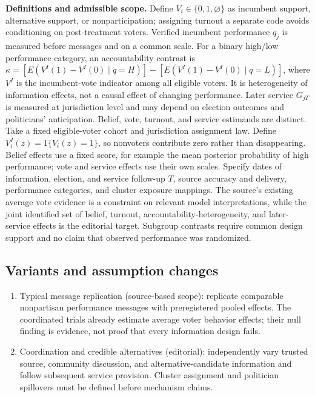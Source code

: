 \documentclass[11pt,a4paper]{article}
\begin{document}
\textbf{Definitions and admissible scope.} Define \(V_i\in\{0,1,\varnothing\}\) as incumbent support, alternative support, or nonparticipation; assigning turnout a separate code avoids conditioning on post-treatment voters. Verified incumbent performance \(q_j\) is measured before messages and on a common scale. For a binary high/low performance category, an accountability contrast is \(\kappa=[E(V^I(1)-V^I(0)\mid q=H)]-[E(V^I(1)-V^I(0)\mid q=L)]\), where \(V^I\) is the incumbent-vote indicator among all eligible voters. It is heterogeneity of information effects, not a causal effect of changing performance. Later service \(G_{jT}\) is measured at jurisdiction level and may depend on election outcomes and politicians' anticipation. Belief, vote, turnout, and service estimands are distinct. Take a fixed eligible-voter cohort and jurisdiction assignment law. Define \(V_i^I(z)=1\{V_i(z)=1\}\), so nonvoters contribute zero rather than disappearing. Belief effects use a fixed score, for example the mean posterior probability of high performance; vote and service effects use their own scales. Specify dates of information, election, and service follow-up \(T\), source accuracy and delivery, performance categories, and cluster exposure mappings. The source's existing average vote evidence is a constraint on relevant model interpretations, while the joint identified set of belief, turnout, accountability-heterogeneity, and later-service effects is the editorial target. Subgroup contrasts require common design support and no claim that observed performance was randomized.
\subsection*{Variants and assumption changes}
\begin{enumerate}
\item Typical message replication (source-based scope): replicate comparable nonpartisan performance messages with preregistered pooled effects. The coordinated trials already estimate average voter behavior effects; their null finding is evidence, not proof that every information design fails.
\item Coordination and credible alternatives (editorial): independently vary trusted source, community discussion, and alternative-candidate information and follow subsequent service provision. Cluster assignment and politician spillovers must be defined before mechanism claims.
\end{enumerate}
\end{document}
